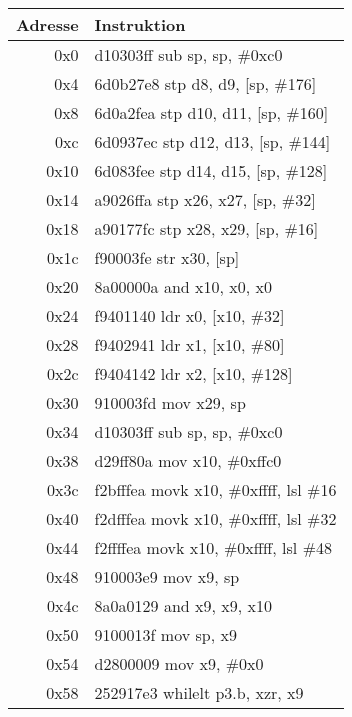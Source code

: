 \documentclass[11pt,a4paper]{article}
\begin{document}
\small
\begin{longtable}{|r|l|}
\hline
\textbf{Adresse} & \textbf{Instruktion} \\
\hline
\endhead

\rowcolor{prologue} 0x0 & d10303ff \quad sub sp, sp, \#0xc0 \\
\rowcolor{prologue} 0x4 & 6d0b27e8 \quad stp d8, d9, [sp, \#176] \\
\rowcolor{prologue} 0x8 & 6d0a2fea \quad stp d10, d11, [sp, \#160] \\
\rowcolor{prologue} 0xc & 6d0937ec \quad stp d12, d13, [sp, \#144] \\
\rowcolor{prologue} 0x10 & 6d083fee \quad stp d14, d15, [sp, \#128] \\
\rowcolor{prologue} 0x14 & a9026ffa \quad stp x26, x27, [sp, \#32] \\
\rowcolor{prologue} 0x18 & a90177fc \quad stp x28, x29, [sp, \#16] \\
\rowcolor{prologue} 0x1c & f90003fe \quad str x30, [sp] \\
\rowcolor{prologue} 0x20 & 8a00000a \quad and x10, x0, x0 \\
\rowcolor{prologue} 0x24 & f9401140 \quad ldr x0, [x10, \#32] \\
\rowcolor{prologue} 0x28 & f9402941 \quad ldr x1, [x10, \#80] \\
\rowcolor{prologue} 0x2c & f9404142 \quad ldr x2, [x10, \#128] \\
\rowcolor{prologue} 0x30 & 910003fd \quad mov x29, sp \\
\rowcolor{prologue} 0x34 & d10303ff \quad sub sp, sp, \#0xc0 \\
\rowcolor{prologue} 0x38 & d29ff80a \quad mov x10, \#0xffc0 \\
\rowcolor{prologue} 0x3c & f2bfffea \quad movk x10, \#0xffff, lsl \#16 \\
\rowcolor{prologue} 0x40 & f2dfffea \quad movk x10, \#0xffff, lsl \#32 \\
\rowcolor{prologue} 0x44 & f2ffffea \quad movk x10, \#0xffff, lsl \#48 \\
\rowcolor{prologue} 0x48 & 910003e9 \quad mov x9, sp \\
\rowcolor{prologue} 0x4c & 8a0a0129 \quad and x9, x9, x10 \\
\rowcolor{prologue} 0x50 & 9100013f \quad mov sp, x9 \\
\rowcolor{prologue} 0x54 & d2800009 \quad mov x9, \#0x0 \\
\rowcolor{prologue} 0x58 & 252917e3 \quad whilelt p3.b, xzr, x9 \\

\end{longtable}
\end{document}
